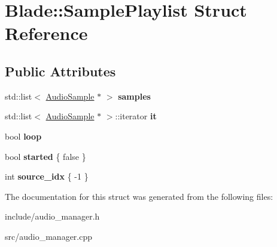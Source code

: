 \hypertarget{struct_blade_1_1_sample_playlist}{}\section{Blade\+:\+:Sample\+Playlist Struct Reference}
\label{struct_blade_1_1_sample_playlist}
\subsection*{Public Attributes}
\begin{DoxyCompactItemize}
\item 
\mbox{\label{struct_blade_1_1_sample_playlist_ad67c205beb8523f9019eb9777536f3bb}} 
std\+::list$<$ \hyperlink{class_blade_1_1_audio_sample}{Audio\+Sample} $\ast$ $>$ {\bfseries samples}
\item 
\mbox{\label{struct_blade_1_1_sample_playlist_a75e205b1ccd51e8840728b68a5dbc85e}} 
std\+::list$<$ \hyperlink{class_blade_1_1_audio_sample}{Audio\+Sample} $\ast$ $>$\+::iterator {\bfseries it}
\item 
\mbox{\label{struct_blade_1_1_sample_playlist_acb96f5c75868058ceac436b1033c7d00}} 
bool {\bfseries loop}
\item 
\mbox{\label{struct_blade_1_1_sample_playlist_a7b32dc1e9b8095aba5cfd5453a353853}} 
bool {\bfseries started} \{ false \}
\item 
\mbox{\label{struct_blade_1_1_sample_playlist_a8253ce5a7fb4637abc1998e7575b16b2}} 
int {\bfseries source\+\_\+idx} \{ -\/1 \}
\end{DoxyCompactItemize}


The documentation for this struct was generated from the following files\+:\begin{DoxyCompactItemize}
\item 
include/audio\+\_\+manager.\+h\item 
src/audio\+\_\+manager.\+cpp\end{DoxyCompactItemize}
